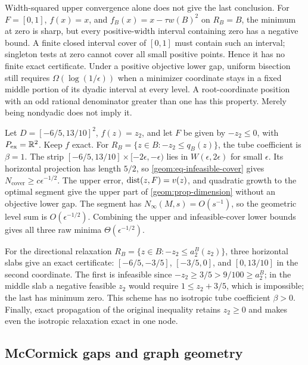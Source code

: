 Width-squared upper convergence alone does not give the last conclusion.
For $F=[0,1]$, $f(x)=x$, and $f_B(x)=x-\tau w(B)^2$ on $R_B=B$, the
minimum at zero is sharp, but every positive-width interval containing
zero has a negative bound. A finite closed interval cover of $[0,1]$
must contain such an interval; singleton tests at zero cannot cover all
small positive points. Hence it has no finite exact certificate.
Under a positive objective lower gap, uniform bisection still requires
$\Omega(\log(1/\epsilon))$ when a minimizer coordinate stays in a fixed
middle portion of its dyadic interval at every level. A root-coordinate
position with an odd rational denominator greater than one has this
property. Merely being nondyadic does not imply it.

\begin{example}
\label{geom:ex-flat-tube}
Let $D=[-6/5,13/10]^2$, $f(z)=z_2$, and let $F$ be given by
$-z_2\leq0$, with $P_{\mathrm{ex}}=\mathbb{R}^2$. Keep $f$ exact.
For $R_B=\{z\in B:-z_2\leq q_B(z)\}$, the tube coefficient is $\beta=1$.
The strip $[-6/5,13/10]\times[-2\epsilon,-\epsilon)$ lies in
$W(\epsilon,2\epsilon)$ for small $\epsilon$. Its horizontal projection
has length $5/2$, so \cref{geom:eq-infeasible-cover} gives
$N_{\mathrm{cover}}\geq c\epsilon^{-1/2}$. The upper error,
$\operatorname{dist}(z,F)=v(z)$, and quadratic growth to the optimal segment give the
upper part of \cref{geom:prop-dimension} without an objective lower gap.
The segment has $N_\infty(M,s)=O(s^{-1})$, so the geometric level sum
is $O(\epsilon^{-1/2})$. Combining the upper and infeasible-cover lower
bounds gives all three raw minima $\Theta(\epsilon^{-1/2})$.

For the directional relaxation
$R_B=\{z\in B:-z_2\leq a_2^B(z_2)\}$, three horizontal slabs give an
exact certificate: $[-6/5,-3/5]$, $[-3/5,0]$, and $[0,13/10]$ in
the second coordinate. The first is infeasible since
$-z_2\geq3/5>9/100\geq a_2^B$; in the middle slab a negative feasible
$z_2$ would require $1\leq z_2+3/5$, which is impossible; the last has
minimum zero. This scheme has no isotropic tube coefficient $\beta>0$.
Finally, exact propagation of the original inequality retains $z_2\geq0$
and makes even the isotropic relaxation exact in one node.
\end{example}

\subsection{McCormick gaps and graph geometry}

